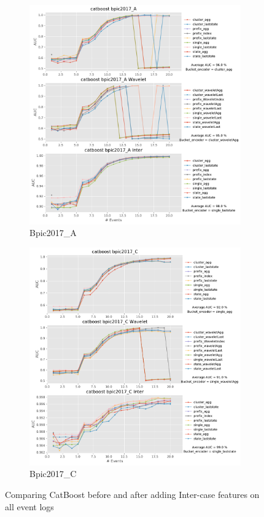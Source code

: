 \documentclass[twoside,11pt]{Latex/Classes/PhDthesisPSnPDF}
\begin{document}
\begin{figure}[!htbp]
	\begin{subfigure}{0.48\textwidth}
		\includegraphics[width=\linewidth]{images/inter/catboost/bpic2017_A.pdf}
		\caption{Bpic2017\_A} \label{fig:b17ai}
	\end{subfigure}\hspace*{\fill}
	\begin{subfigure}{0.48\textwidth}
		\includegraphics[width=\linewidth]{images/inter/catboost/bpic2017_C.pdf}
		\caption{Bpic2017\_C} \label{fig:b17ci}
	\end{subfigure}
		\caption{Comparing CatBoost before and after adding Inter-case features on all event logs}
	\label{fig:interc1}
\end{figure}
\end{document}
